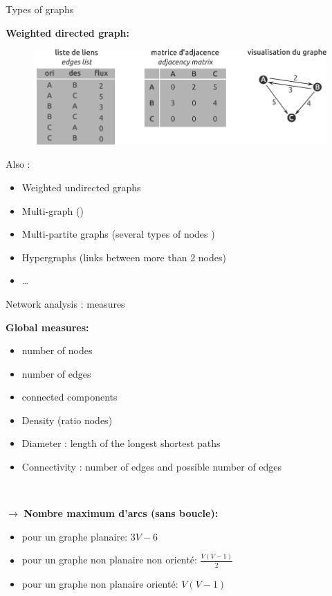 \begin{frame}{Types of graphs}

\textbf{Weighted directed graph:}

\begin{figure}
  \includegraphics[width=12cm]{MatGraph1.pdf}
\end{figure}

Also :
\begin{itemize}
  \item Weighted undirected graphs
  \item Multi-graph ()
  \item Multi-partite graphs (several types of nodes )
  \item Hypergraphs (links between more than 2 nodes)
  \item \ldots
\end{itemize}

\end{frame}





\begin{frame}{Network analysis : measures}

\textbf{Global measures:}

\begin{itemize}
\item number of nodes
\item number of edges
\item connected components
\item Density (ratio nodes)
\item Diameter : length of the longest shortest paths 
\item Connectivity : number of edges and possible number of edges
\end{itemize}

~

$\rightarrow$ \textbf{Nombre maximum d’arcs (sans boucle):}

\begin{itemize}
\item pour un graphe planaire: $3V - 6$
\item pour un graphe non planaire non orienté: $\frac{V(V-1)}{2}$ 
\item pour un graphe non planaire orienté: $V(V-1)$
\end{itemize}

\end{frame}

